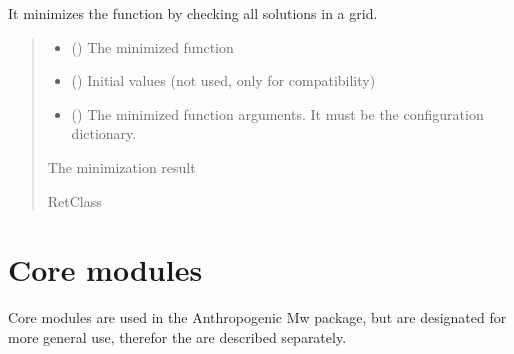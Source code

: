 \documentclass[letterpaper,10pt,english]{sphinxmanual}
\begin{document}
\begin{fulllineitems}
\label{\detokenize{api_support:amw.mw.MinimizeInGrid.grid_search}}
\pysigstartsignatures
{}
\pysigstopsignatures
\sphinxAtStartPar
It minimizes the function by checking all solutions in a grid.
\begin{quote}\begin{description}
\begin{itemize}
\item {} 
\sphinxAtStartPar
{} () \textendash{} The minimized function

\item {} 
\sphinxAtStartPar
{} () \textendash{} Initial values (not used, only for compatibility)

\item {} 
\sphinxAtStartPar
{} () \textendash{} The minimized function arguments. It must be the configuration dictionary.

\end{itemize}

\sphinxAtStartPar
The minimization result

\sphinxAtStartPar
RetClass

\end{description}\end{quote}

\end{fulllineitems}


\sphinxstepscope


\section{Core modules}
\label{\detokenize{api_core:core-modules}}\label{\detokenize{api_core::doc}}
\sphinxAtStartPar
Core modules are used in the Anthropogenic Mw package,
but are designated for more general use, therefor the are described separately.
\end{document}
